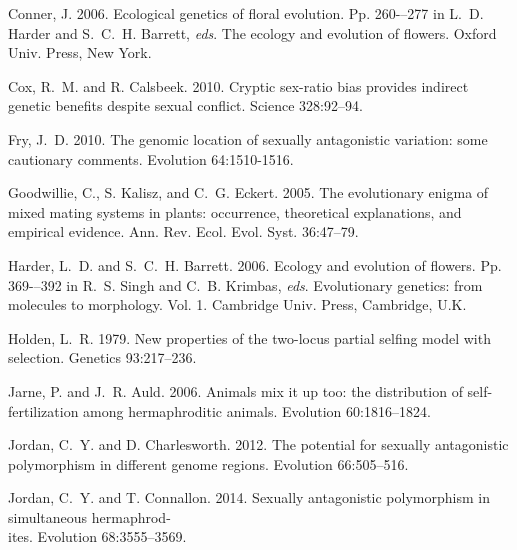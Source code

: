 \documentclass{article}
\begin{document}
\begin{thebibliography}{}
Conner, J. 2006.
\newblock Ecological genetics of floral evolution.
\newblock Pp. 260-–277 in L.~D. Harder and S.~C.~H. Barrett, \textit{eds}. The ecology and evolution of flowers. Oxford Univ. Press, New York.

Cox, R.~M. and R. Calsbeek. 2010.
\newblock Cryptic sex-ratio bias provides indirect genetic benefits despite sexual conflict.
\newblock Science 328:92--94.

Fry, J.~D. 2010.
\newblock The genomic location of sexually antagonistic variation: some cautionary comments.
\newblock Evolution 64:1510-1516.

Goodwillie, C., S. Kalisz, and C.~G. Eckert. 2005.
\newblock The evolutionary enigma of mixed mating systems in plants: occurrence, theoretical explanations, and empirical evidence.
\newblock Ann. Rev. Ecol. Evol. Syst. 36:47--79.

Harder, L.~D. and S.~C.~H. Barrett. 2006.
\newblock Ecology and evolution of flowers.
\newblock Pp. 369-–392 in R.~S. Singh and C.~B. Krimbas, \textit{eds}. Evolutionary genetics: from molecules to morphology. Vol. 1. Cambridge Univ. Press, Cambridge, U.K.


Holden, L.~R. 1979.
\newblock New properties of the two-locus partial selfing model with selection.
\newblock Genetics 93:217--236.

Jarne, P. and J.~R. Auld. 2006.
\newblock Animals mix it up too: the distribution of self-fertilization among hermaphroditic animals.
\newblock Evolution 60:1816--1824.

Jordan, C.~Y. and D. Charlesworth. 2012.
\newblock The potential for sexually antagonistic polymorphism in different genome regions.
\newblock Evolution 66:505--516.

Jordan, C.~Y. and T. Connallon. 2014.
\newblock Sexually antagonistic polymorphism in simultaneous hermaphrod-\\ites.
\newblock Evolution 68:3555--3569.


\end{thebibliography}
\end{document}

